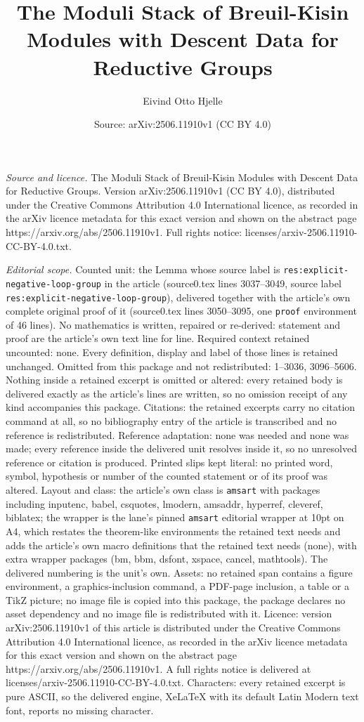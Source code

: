 \documentclass[10pt,a4paper]{amsart}
\title[The Moduli Stack of Breuil-Kisin Modules with Descent Data f]{The Moduli Stack of Breuil-Kisin Modules with Descent Data for Reductive Groups}
\author{Eivind Otto Hjelle}
\date{Source: arXiv:2506.11910v1 (CC BY 4.0)}
\begin{document}
\maketitle

\noindent\emph{Source and licence.} The Moduli Stack of Breuil-Kisin Modules with Descent Data for Reductive Groups. Version arXiv:2506.11910v1 (CC BY 4.0), distributed under the Creative Commons Attribution 4.0 International licence, as recorded in the arXiv licence metadata for this exact version and shown on the abstract page https://arxiv.org/abs/2506.11910v1. Full rights notice: licenses/arxiv-2506.11910-CC-BY-4.0.txt.\par\smallskip

\noindent\textit{Editorial scope.} Counted unit: the Lemma whose source label is \texttt{res:explicit-negative-loop-group} in the article (source0.tex lines 3037--3049, source label \texttt{res:explicit-negative-loop-group}), delivered together with the article's own complete original proof of it (source0.tex lines 3050--3095, one \texttt{proof} environment of 46 lines). No mathematics is written, repaired or re-derived: statement and proof are the article's own text line for line. Required context retained uncounted: none. Every definition, display and label of those lines is retained unchanged. Omitted from this package and not redistributed: 1--3036, 3096--5606. Nothing inside a retained excerpt is omitted or altered: every retained body is delivered exactly as the article's lines are written, so no omission receipt of any kind accompanies this package. Citations: the retained excerpts carry no citation command at all, so no bibliography entry of the article is transcribed and no reference is redistributed. Reference adaptation: none was needed and none was made; every reference inside the delivered unit resolves inside it, so no unresolved reference or citation is produced. Printed slips kept literal: no printed word, symbol, hypothesis or number of the counted statement or of its proof was altered. Layout and class: the article's own class is \texttt{amsart} with packages including inputenc, babel, csquotes, lmodern, amsaddr, hyperref, cleveref, biblatex; the wrapper is the lane's pinned \texttt{amsart} editorial wrapper at 10pt on A4, which restates the theorem-like environments the retained text needs and adds the article's own macro definitions that the retained text needs (none), with extra wrapper packages (bm, bbm, dsfont, xspace, cancel, mathtools). The delivered numbering is the unit's own. Assets: no retained span contains a figure environment, a graphics-inclusion command, a PDF-page inclusion, a table or a TikZ picture; no image file is copied into this package, the package declares no asset dependency and no image file is redistributed with it. Licence: version arXiv:2506.11910v1 of this article is distributed under the Creative Commons Attribution 4.0 International licence, as recorded in the arXiv licence metadata for this exact version and shown on the abstract page https://arxiv.org/abs/2506.11910v1. A full rights notice is delivered at licenses/arxiv-2506.11910-CC-BY-4.0.txt. Characters: every retained excerpt is pure ASCII, so the delivered engine, XeLaTeX with its default Latin Modern text font, reports no missing character.
\end{document}
